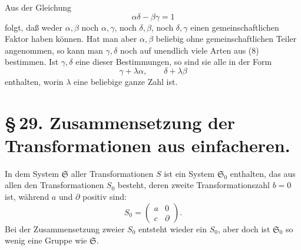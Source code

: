 \documentclass[11pt]{article}
\begin{document}
Aus der Gleichung
\begin{equation}
\alpha\delta-\beta\gamma=1 \tag{8}
\end{equation}
folgt, daß weder $\alpha,\beta$ noch $\alpha,\gamma$, noch $\delta,\beta$, noch $\delta,\gamma$ einen gemeinschaftlichen Faktor haben können. Hat man aber $\alpha,\beta$ beliebig ohne gemeinschaftlichen Teiler angenommen, so kann man $\gamma,\delta$ noch auf unendlich viele Arten aus (8) bestimmen. Ist $\gamma,\delta$ eine dieser Bestimmungen, so sind sie alle in der Form
\begin{equation}
\gamma+\lambda\alpha,
\qquad
\delta+\lambda\beta \tag{9}
\end{equation}
enthalten, worin $\lambda$ eine beliebige ganze Zahl ist.

\section*{\S\,29. Zusammensetzung der Transformationen aus einfacheren.}

In dem System $\mathfrak S$ aller Transformationen $S$ ist ein System $\mathfrak S_0$ enthalten, das aus allen den Transformationen $S_0$ besteht, deren zweite Transformationszahl $b=0$ ist, während $a$ und $\partial$ positiv sind:
\begin{equation}
S_0=\begin{pmatrix}a&0\\ c&\partial\end{pmatrix}. \tag{1}
\end{equation}
Bei der Zusammensetzung zweier $S_0$ entsteht wieder ein $S_0$, aber doch ist $\mathfrak S_0$ so wenig eine Gruppe wie $\mathfrak S$.
\end{document}
